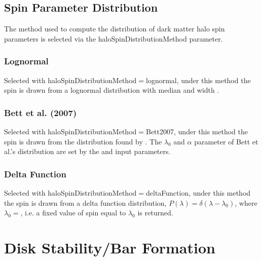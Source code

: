\subsection{Spin Parameter Distribution}\label{sec:SpinParameterDistribution}

The method used to compute the distribution of dark matter halo spin parameters is selected via the {\normalfont \ttfamily haloSpinDistributionMethod} parameter.

\subsubsection{Lognormal}

Selected with {\normalfont \ttfamily haloSpinDistributionMethod}$=${\normalfont \ttfamily lognormal}, under this method the spin is drawn from a lognormal distribution with median {\normalfont \ttfamily [lognormalSpinDistributionMedian]} and width {\normalfont \ttfamily [lognormalSpinDistributionSigma]}.

\subsubsection{Bett et al. (2007)}

Selected with {\normalfont \ttfamily haloSpinDistributionMethod}$=${\normalfont \ttfamily Bett2007}, under this method the spin is drawn from the distribution found by \cite{bett_spin_2007}. The $\lambda_0$ and $\alpha$ parameter of Bett et al.'s distribution are set by the {\normalfont {}} and {\normalfont {}} input parameters.

\subsubsection{Delta Function}

Selected with {\normalfont \ttfamily haloSpinDistributionMethod}$=${\normalfont \ttfamily deltaFunction}, under this method the spin is drawn from a delta function distribution, $P(\lambda) = \delta(\lambda-\lambda_0)$, where $\lambda_0=${\normalfont \ttfamily [deltaFunctionSpinDistributionSpin]}, i.e. a fixed value of spin equal to $\lambda_0$ is returned.

\section{Disk Stability/Bar Formation}\label{sec:DiskStability}

